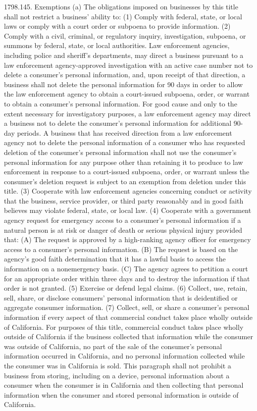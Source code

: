 1798.145.  Exemptions
(a) The obligations imposed on businesses by this title shall not restrict a business’ ability to:
(1) Comply with federal, state, or local laws or comply with a court order or subpoena to provide information.
(2) Comply with a civil, criminal, or regulatory inquiry, investigation, subpoena, or summons by federal, state, or local authorities. Law enforcement agencies, including police and sheriff’s departments, may direct a business pursuant to a law enforcement agency-approved investigation with an active case number not to delete a consumer’s personal information, and, upon receipt of that direction, a business shall not delete the personal information for 90 days in order to allow the law enforcement agency to obtain a court-issued subpoena, order, or warrant to obtain a consumer’s personal information. For good cause and only to the extent necessary for investigatory purposes, a law enforcement agency may direct a business not to delete the consumer’s personal information for additional 90-day periods. A business that has received direction from a law enforcement agency not to delete the personal information of a consumer who has requested deletion of the consumer’s personal information shall not use the consumer’s personal information for any purpose other than retaining it to produce to law enforcement in response to a court-issued subpoena, order, or warrant unless the consumer’s deletion request is subject to an exemption from deletion under this title.
(3) Cooperate with law enforcement agencies concerning conduct or activity that the business, service provider, or third party reasonably and in good faith believes may violate federal, state, or local law.
(4) Cooperate with a government agency request for emergency access to a consumer’s personal information if a natural person is at risk or danger of death or serious physical injury provided that:
(A) The request is approved by a high-ranking agency officer for emergency access to a consumer’s personal information.
(B) The request is based on the agency’s good faith determination that it has a lawful basis to access the information on a nonemergency basis.
(C) The agency agrees to petition a court for an appropriate order within three days and to destroy the information if that order is not granted.
(5) Exercise or defend legal claims.
(6) Collect, use, retain, sell, share, or disclose consumers’ personal information that is deidentified or aggregate consumer information.
(7) Collect, sell, or share a consumer’s personal information if every aspect of that commercial conduct takes place wholly outside of California. For purposes of this title, commercial conduct takes place wholly outside of California if the business collected that information while the consumer was outside of California, no part of the sale of the consumer’s personal information occurred in California, and no personal information collected while the consumer was in California is sold. This paragraph shall not prohibit a business from storing, including on a device, personal information about a consumer when the consumer is in California and then collecting that personal information when the consumer and stored personal information is outside of California.
